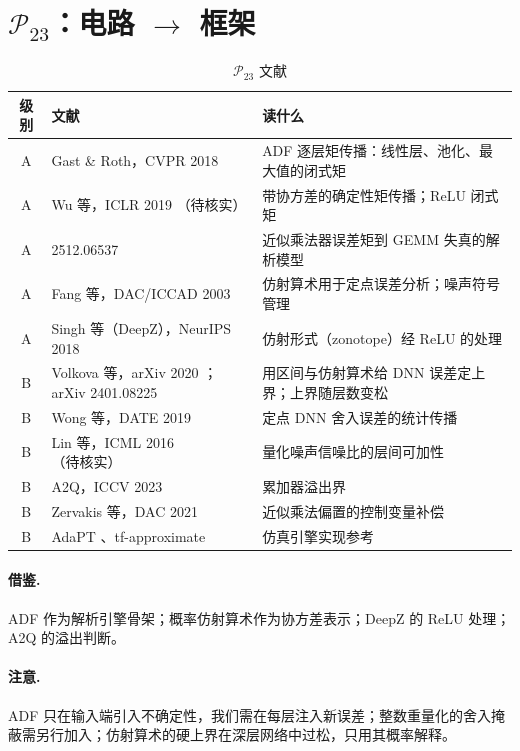 \documentclass[11pt,a4paper]{ctexart}
\begin{document}
\section{$\mathcal P_{23}$：电路 $\to$ 框架}
\begin{table}[h]
\centering
\small
\begin{tabularx}{\textwidth}{@{}clX@{}}
\toprule
级别 & 文献 & 读什么 \\
\midrule
A & Gast \& Roth，CVPR 2018 \cite{gast2018} & ADF 逐层矩传播：线性层、池化、最大值的闭式矩 \\
A & Wu 等，ICLR 2019 \cite{wu2019}（待核实） & 带协方差的确定性矩传播；ReLU 闭式矩 \\
A & 2512.06537 \cite{amierr} & 近似乘法器误差矩到 GEMM 失真的解析模型 \\
A & Fang 等，DAC/ICCAD 2003 \cite{fang2003} & 仿射算术用于定点误差分析；噪声符号管理 \\
A & Singh 等（DeepZ），NeurIPS 2018 \cite{deepz} & 仿射形式（zonotope）经 ReLU 的处理 \\
B & Volkova 等，arXiv 2020 \cite{volkova2020}；arXiv 2401.08225 \cite{certified2024} & 用区间与仿射算术给 DNN 误差定上界；上界随层数变松 \\
B & Wong 等，DATE 2019 \cite{wong2019} & 定点 DNN 舍入误差的统计传播 \\
B & Lin 等，ICML 2016 \cite{lin2016}（待核实） & 量化噪声信噪比的层间可加性 \\
B & A2Q，ICCV 2023 \cite{a2q} & 累加器溢出界 \\
B & Zervakis 等，DAC 2021 \cite{zervakis2021} & 近似乘法偏置的控制变量补偿 \\
B & AdaPT \cite{adapt}、tf-approximate \cite{tfapprox} & 仿真引擎实现参考 \\
\bottomrule
\end{tabularx}
\caption{$\mathcal P_{23}$ 文献}
\end{table}

\paragraph{借鉴.} ADF 作为解析引擎骨架；概率仿射算术作为协方差表示；DeepZ 的 ReLU 处理；A2Q 的溢出判断。
\paragraph{注意.} ADF 只在输入端引入不确定性，我们需在每层注入新误差；整数重量化的舍入掩蔽需另行加入；仿射算术的硬上界在深层网络中过松，只用其概率解释。
\end{document}
